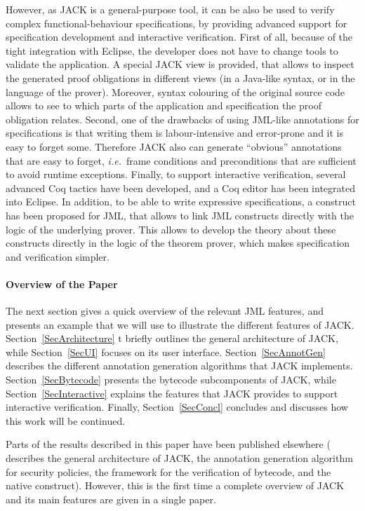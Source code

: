 However, as JACK is a general-purpose tool, it can be also be used to
verify complex functional-behaviour specifications, by providing
advanced support for specification development and interactive
verification. First of all, because of the tight integration with
Eclipse, the developer does not have to change tools to validate the
application. A special JACK view is provided, that allows to inspect
the generated proof obligations in different views (in a Java-like
syntax, or in the language of the prover). Moreover, syntax colouring
of the original source code allows to see to which parts of the
application and specification the proof obligation relates. Second,
one of the drawbacks of using JML-like annotations for specifications
is that writing them is labour-intensive and error-prone and it is
easy to forget some. Therefore JACK also can generate ``obvious''
annotations that are easy to forget, \emph{i.e.}\ frame conditions and
preconditions that are sufficient to avoid runtime
exceptions. Finally, to support interactive verification, several
advanced Coq tactics have been developed, and a Coq editor has been
integrated into Eclipse. In addition, to be able to write expressive
specifications, a
\native construct has been proposed for JML, that allows to
link JML constructs directly with the logic of the underlying
prover. This allows to develop the theory about these constructs
directly in the logic of the theorem prover, which makes specification
and verification simpler.


\paragraph{Overview of the Paper}
The next section gives a quick overview of the relevant JML features,
and presents an example that we will use to illustrate the different
features of JACK. Section~\ref{SecArchitecture} t briefly outlines the
general architecture of JACK, while Section~\ref{SecUI} focuses on its
user interface. Section~\ref{SecAnnotGen} describes the different
annotation generation algorithms that JACK
implements. Section~\ref{SecBytecode} presents the bytecode
subcomponents of JACK, while Section~\ref{SecInteractive} explains the
features that JACK provides to support interactive
verification. Finally, Section~\ref{SecConcl} concludes and discusses
how this work will be continued.

Parts of the results described in this paper have been published
elsewhere (\cite{BurdyRL03} describes the general architecture of
JACK, \cite{PavlovaBBHL04cardis} the annotation generation algorithm
for security policies, \cite{BP06JSV} the framework for the
verification of bytecode, and \cite{Charles06} the native
construct). However, this is the first time a complete overview of
JACK and its main features are given in a single paper.


